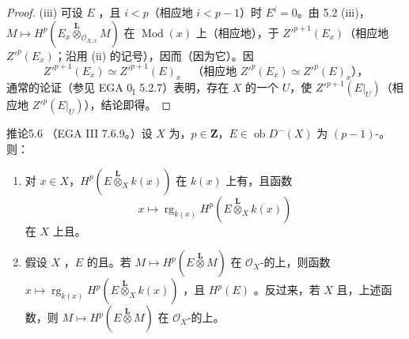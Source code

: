 \begin{proof}
(iii) 可设 $E$ ，且 $i<p$（相应地 $i<p-1$）时 $E^i=0$。由 5.2 (iii)， $M\mapsto H^p(E_x\mathbin{\overset{\mathbf L}{\otimes}}_{\mathcal O_{X,x}}M)$ 在 $\operatorname{Mod}(x)$ 上（相应地），于 $Z'^{p+1}(E_x)$（相应地 $Z'^p(E_x)$；沿用 (ii) 的记号），因而（因为它）。因
\[
Z'^{p+1}(E_x)\simeq Z'^{p+1}(E)_x
\quad\text{（相应地 }Z'^p(E_x)\simeq Z'^p(E)_x\text{），}
\]
通常的论证（参见 EGA $0_{\mathrm I}$ 5.2.7）表明，存在 $X$ 的一个 $U$，使 $Z'^{p+1}(E|_U)$（相应地 $Z'^p(E|_U)$），结论即得。
\end{proof}
\begin{SGAresult}{推论}{5.6}
（EGA III 7.6.9。）设 $X$ 为，$p\in\mathbf Z$，$E\in\operatorname{ob}D^-(X)$ 为 $(p-1)$-。则：
\begin{enumerate}
\item[(i)] 对 $x\in X$，$H^p(E\mathbin{\overset{\mathbf L}{\otimes}}_Xk(x))$ 在 $k(x)$ 上有，且函数
\[
x\longmapsto\operatorname{rg}_{k(x)}H^p(E\mathbin{\overset{\mathbf L}{\otimes}}_Xk(x))
\]
在 $X$ 上且。
\item[(ii)] 假设 $X$ ，$E$ 的且。若 $M\mapsto H^p(E\mathbin{\overset{\mathbf L}{\otimes}}M)$ 在 $\mathcal O_X$-的上，则函数 $x\mapsto\operatorname{rg}_{k(x)}H^p(E\mathbin{\overset{\mathbf L}{\otimes}}_Xk(x))$ ，且 $H^p(E)$ 。反过来，若 $X$ 且，上述函数，则 $M\mapsto H^p(E\mathbin{\overset{\mathbf L}{\otimes}}M)$ 在 $\mathcal O_X$-的上。
\end{enumerate}
\end{SGAresult}
